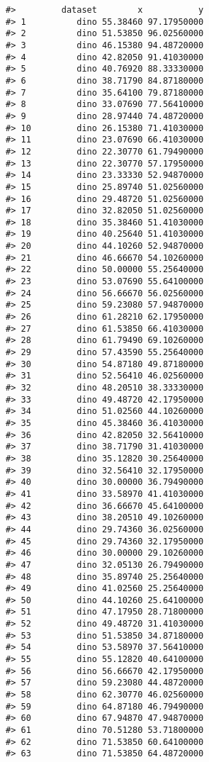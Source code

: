 \documentclass[
]{book}
\theoremstyle{definition}
\theoremstyle{definition}
\theoremstyle{definition}
\theoremstyle{definition}
\theoremstyle{remark}
\begin{document}
\begin{verbatim}
#>         dataset        x           y
#> 1          dino 55.38460 97.17950000
#> 2          dino 51.53850 96.02560000
#> 3          dino 46.15380 94.48720000
#> 4          dino 42.82050 91.41030000
#> 5          dino 40.76920 88.33330000
#> 6          dino 38.71790 84.87180000
#> 7          dino 35.64100 79.87180000
#> 8          dino 33.07690 77.56410000
#> 9          dino 28.97440 74.48720000
#> 10         dino 26.15380 71.41030000
#> 11         dino 23.07690 66.41030000
#> 12         dino 22.30770 61.79490000
#> 13         dino 22.30770 57.17950000
#> 14         dino 23.33330 52.94870000
#> 15         dino 25.89740 51.02560000
#> 16         dino 29.48720 51.02560000
#> 17         dino 32.82050 51.02560000
#> 18         dino 35.38460 51.41030000
#> 19         dino 40.25640 51.41030000
#> 20         dino 44.10260 52.94870000
#> 21         dino 46.66670 54.10260000
#> 22         dino 50.00000 55.25640000
#> 23         dino 53.07690 55.64100000
#> 24         dino 56.66670 56.02560000
#> 25         dino 59.23080 57.94870000
#> 26         dino 61.28210 62.17950000
#> 27         dino 61.53850 66.41030000
#> 28         dino 61.79490 69.10260000
#> 29         dino 57.43590 55.25640000
#> 30         dino 54.87180 49.87180000
#> 31         dino 52.56410 46.02560000
#> 32         dino 48.20510 38.33330000
#> 33         dino 49.48720 42.17950000
#> 34         dino 51.02560 44.10260000
#> 35         dino 45.38460 36.41030000
#> 36         dino 42.82050 32.56410000
#> 37         dino 38.71790 31.41030000
#> 38         dino 35.12820 30.25640000
#> 39         dino 32.56410 32.17950000
#> 40         dino 30.00000 36.79490000
#> 41         dino 33.58970 41.41030000
#> 42         dino 36.66670 45.64100000
#> 43         dino 38.20510 49.10260000
#> 44         dino 29.74360 36.02560000
#> 45         dino 29.74360 32.17950000
#> 46         dino 30.00000 29.10260000
#> 47         dino 32.05130 26.79490000
#> 48         dino 35.89740 25.25640000
#> 49         dino 41.02560 25.25640000
#> 50         dino 44.10260 25.64100000
#> 51         dino 47.17950 28.71800000
#> 52         dino 49.48720 31.41030000
#> 53         dino 51.53850 34.87180000
#> 54         dino 53.58970 37.56410000
#> 55         dino 55.12820 40.64100000
#> 56         dino 56.66670 42.17950000
#> 57         dino 59.23080 44.48720000
#> 58         dino 62.30770 46.02560000
#> 59         dino 64.87180 46.79490000
#> 60         dino 67.94870 47.94870000
#> 61         dino 70.51280 53.71800000
#> 62         dino 71.53850 60.64100000
#> 63         dino 71.53850 64.48720000

\end{verbatim}
\end{document}
